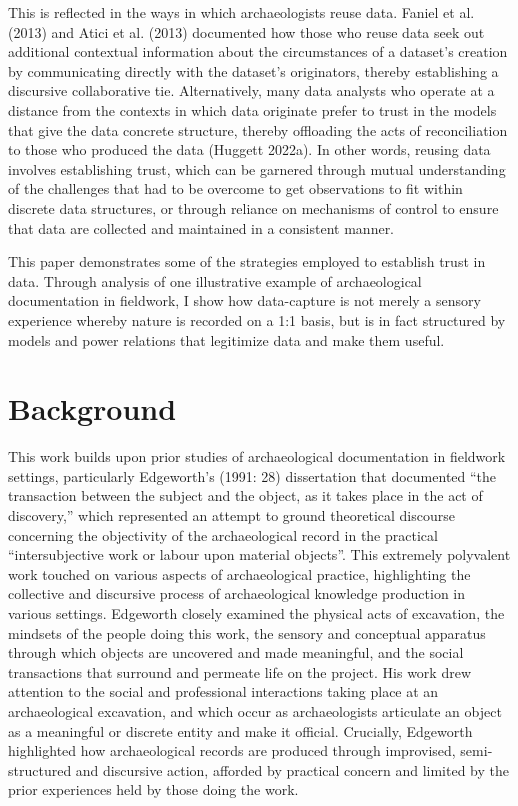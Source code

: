 \documentclass[
]{article}
\begin{document}
This is reflected in the ways in which archaeologists reuse data. Faniel
et al. (2013) and Atici et al. (2013) documented how those who reuse
data seek out additional contextual information about the circumstances
of a dataset's creation by communicating directly with the dataset's
originators, thereby establishing a discursive collaborative tie.
Alternatively, many data analysts who operate at a distance from the
contexts in which data originate prefer to trust in the models that give
the data concrete structure, thereby offloading the acts of
reconciliation to those who produced the data (Huggett 2022a). In other
words, reusing data involves establishing trust, which can be garnered
through mutual understanding of the challenges that had to be overcome
to get observations to fit within discrete data structures, or through
reliance on mechanisms of control to ensure that data are collected and
maintained in a consistent manner.

This paper demonstrates some of the strategies employed to establish
trust in data. Through analysis of one illustrative example of
archaeological documentation in fieldwork, I show how data-capture is
not merely a sensory experience whereby nature is recorded on a 1:1
basis, but is in fact structured by models and power relations that
legitimize data and make them useful.

\section{Background}\label{background}

This work builds upon prior studies of archaeological documentation in
fieldwork settings, particularly Edgeworth's (1991: 28) dissertation
that documented ``the transaction between the subject and the object, as
it takes place in the act of discovery,'' which represented an attempt
to ground theoretical discourse concerning the objectivity of the
archaeological record in the practical ``intersubjective work or labour
upon material objects''. This extremely polyvalent work touched on
various aspects of archaeological practice, highlighting the collective
and discursive process of archaeological knowledge production in various
settings. Edgeworth closely examined the physical acts of excavation,
the mindsets of the people doing this work, the sensory and conceptual
apparatus through which objects are uncovered and made meaningful, and
the social transactions that surround and permeate life on the project.
His work drew attention to the social and professional interactions
taking place at an archaeological excavation, and which occur as
archaeologists articulate an object as a meaningful or discrete entity
and make it official. Crucially, Edgeworth highlighted how
archaeological records are produced through improvised, semi-structured
and discursive action, afforded by practical concern and limited by the
prior experiences held by those doing the work.
\end{document}
